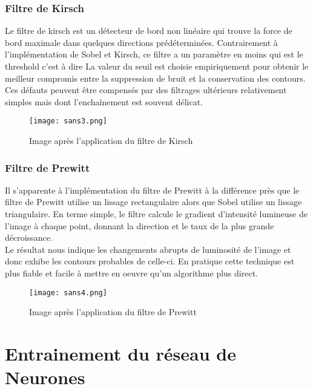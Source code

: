 \documentclass[a4paper,11pt]{report}
\begin{document}
\subsection{Filtre de Kirsch}
Le filtre de kirsch est un détecteur de bord non
linéaire qui trouve la force de bord maximale dans quelques directions prédéterminées. Contrairement à l'implémentation de Sobel et Kirsch, ce filtre a
un paramètre en moins qui est le threshold c'est à dire La valeur du seuil
est choisie empiriquement pour obtenir le meilleur compromis entre la suppression de bruit et la conservation des contours. Ces défauts peuvent
être compensés par des filtrages ultérieurs relativement simples mais dont
l'enchaînement est souvent délicat.

\begin{figure}[!htbp]
\begin{center}
\texttt{[image: sans3.png]}
\caption{Image après l'application du filtre de Kirsch}
\end{center}
\end{figure} 

\subsection{Filtre de Prewitt}
Il s'apparente à l'implémentation du filtre de Prewitt à la différence près que le filtre de Prewitt utilise un lissage rectangulaire alors que Sobel utilise un lissage triangulaire. En terme simple,
le filtre calcule le gradient d'intensité lumineuse de l'image à chaque point,
donnant la direction et le taux de la plus grande décroissance. \\
Le résultat
nous indique les changements abrupts de luminosité de l'image et donc exhibe les contours probables de celle-ci. En pratique cette technique est plus
fiable et facile à mettre en oeuvre qu'un algorithme plus direct.
\begin{figure}[!htbp]
\begin{center}
\texttt{[image: sans4.png]}
\caption{Image après l'application du filtre de Prewitt}
\end{center}
\end{figure} 




\chapter{Entrainement du réseau de Neurones}
\end{document}

